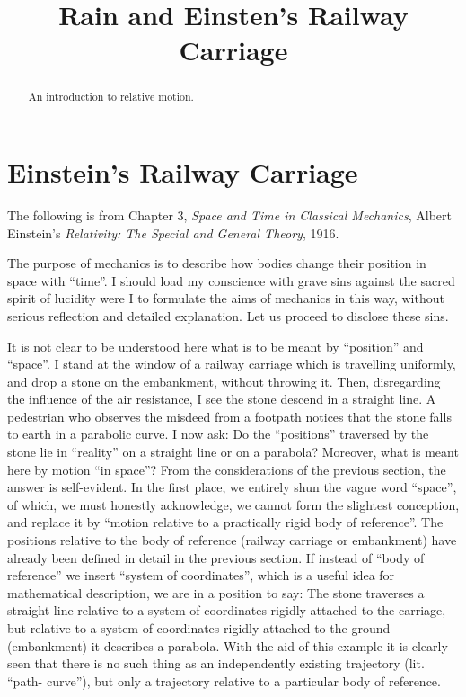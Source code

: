 \documentclass{ximera}
\title{Rain and Einsten's Railway Carriage}
\begin{document}
\begin{abstract}
An introduction to relative motion.
\end{abstract}
\maketitle

\section{Einstein's Railway Carriage}

The following is from  Chapter 3, \emph{Space and Time in Classical Mechanics}, Albert Einstein's \emph{Relativity: The Special and General Theory}, 1916.

The purpose of mechanics is to describe how bodies change their position in space with ``time''. I should load my conscience with grave sins against the sacred spirit of lucidity were I to formulate the aims of mechanics in this way, without serious reflection and detailed explanation. Let us proceed to disclose these sins.

 It is not clear to be understood here what is to be meant by ``position'' and ``space''. I stand at the window of a railway carriage which is travelling uniformly, and drop a stone on the embankment, without throwing it. Then, disregarding the influence of the air resistance, I see the stone descend in a straight line. A pedestrian who observes the misdeed from a footpath notices that the stone falls to earth in a parabolic curve. I now ask: Do the ``positions'' traversed by the stone lie in ``reality'' on a straight line or on a parabola? Moreover, what is meant here by motion ``in space''? From the considerations of the previous section, the answer is self-evident. In the first place, we entirely shun the vague word ``space'', of which, we must honestly acknowledge, we cannot form the slightest conception, and replace it by ``motion relative to a practically rigid body of reference''. The positions relative to the body of reference (railway carriage or embankment) have already been defined in detail in the previous section. If instead of ``body of reference'' we insert ``system of coordinates'', which is a useful idea for mathematical description, we are in a position to say: The stone traverses a straight line relative to a system of coordinates rigidly attached to the carriage, but relative to a system of coordinates rigidly attached to the ground (embankment) it describes a parabola. With the aid of this example it is clearly seen that there is no such thing as an independently existing trajectory (lit. ``path- curve''), but only a trajectory relative to a particular body of reference. 
\end{document}

